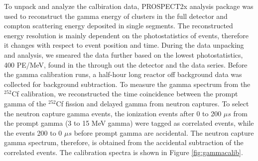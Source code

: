 To unpack and analyze the calbiration data, PROSPECT2x analysis package was used to reconstruct the gamma energy of clusters in the full detector and compton scattering energy deposited in single segments. 
The reconstructed energy resolution is mainly dependent on the photostatistics of events, therefore it changes with respect to event position and time. 
During the data unpacking and analysis, we smeared the data further based on the lowest photostatistics, 400 PE/MeV, found in the through out the detector and the data series.
Before the gamma calibration runs, a half-hour long reactor off background data was collected for background subtraction.
To measure the gamma spectrum from the $^{252}$Cf calibration, we reconstructed the time coincidence between the prompt gamma of the $^{252}$Cf fission and delayed gamma from neutron captures.
To select the neutron capture gamma events, the ionization events after 0 to 200 $\mu s$ from the prompt gamma (3 to 15 MeV gamma) were tagged as correlated events, while the events 200 to 0 $\mu s$ before prompt gamma are accidental.
The neutron capture gamma spectrum, therefore, is obtained from the accidental subtraction of the correlated events. 
The calibration spectra is shown in Figure \ref{fig:gammacalib}.


